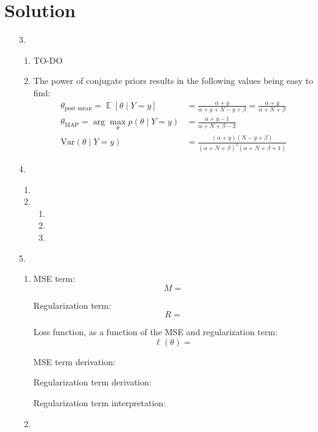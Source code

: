 \documentclass[submit]{harvardml}
\newenvironment{answer}
  {\section*{Solution}}
{}
\DeclareMathOperator*{\mean}{\mathbb{E}}
\begin{document}
\begin{answer}
\begin{enumerate}
    \item[3.]

      \begin{enumerate}
        \item TO-DO

        \item
        The power of conjugate priors results in the following values being easy to find:
              \begin{align*}
                \theta_{\text{post mean}} = \mean [\theta \mid Y = y]     & = \frac{\alpha + y}{\alpha + y + N - y + \beta} = \frac{\alpha + y}{\alpha + N + \beta}\\
                \theta_{\text{MAP}} =\arg \max_{\theta}p(\theta \mid Y=y) & = \frac{\alpha + y - 1}{\alpha + N + \beta -2}\\
                \mathrm{Var}(\theta \mid Y = y)                           & = \frac{(\alpha + y)(N - y + \beta)}{(\alpha + N + \beta)^2(\alpha + N + \beta +1)}
              \end{align*}

      \end{enumerate}

    \item[4.]

      \begin{enumerate}
        \item

        \item
              \begin{enumerate}
                \item

                \item

                \item
              \end{enumerate}

      \end{enumerate}

    \item[5.]

      \begin{enumerate}
        \item
              MSE term:
              \[
                M =
              \]

              Regularization term:
              \[
                R =
              \]

              Loss function, as a function of the MSE and regularization term:
              \[
                \ell(\theta) =
              \]

              MSE term derivation:

              Regularization term derivation:

              Regularization term interpretation:

        \item

      \end{enumerate}

  \end{enumerate}
\end{answer}
\end{document}
